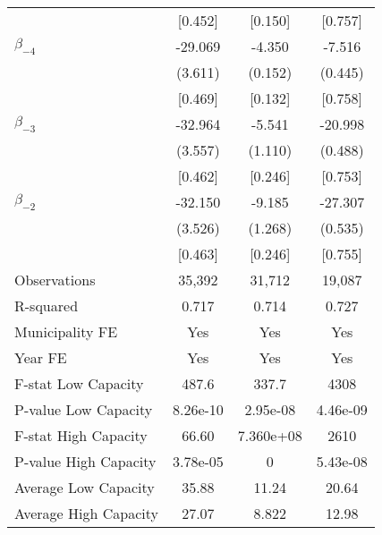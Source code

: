 \documentclass[]{article}
\begin{document}
\begin{table}[htbp]
\begin{tabular}{lccc}
& [0.452] & [0.150] & [0.757] \\
$\beta_{-4}$ & -29.069 & -4.350 & -7.516\\
& (3.611) & (0.152) & (0.445) \\
& [0.469] & [0.132] & [0.758] \\
$\beta_{-3}$ & -32.964 & -5.541 & -20.998 \\
& (3.557) & (1.110) & (0.488) \\
& [0.462] & [0.246] & [0.753] \\
$\beta_{-2}$ & -32.150 & -9.185 & -27.307 \\
& (3.526) & (1.268) & (0.535) \\
& [0.463] & [0.246] & [0.755] \\
\hline
Observations & 35,392 & 31,712 & 19,087 \\
R-squared & 0.717 & 0.714 & 0.727 \\
Municipality FE & Yes & Yes & Yes \\
Year FE & Yes & Yes & Yes \\
F-stat Low Capacity & 487.6 & 337.7 & 4308 \\
P-value Low Capacity & 8.26e-10 & 2.95e-08 & 4.46e-09 \\
F-stat High Capacity & 66.60 & 7.360e+08 & 2610 \\
P-value High Capacity & 3.78e-05 & 0 & 5.43e-08 \\
Average Low Capacity & 35.88 & 11.24 & 20.64 \\
Average High Capacity & 27.07 & 8.822 & 12.98 \\
\hline\hline
\end{tabular}
\end{table}
\end{document}
